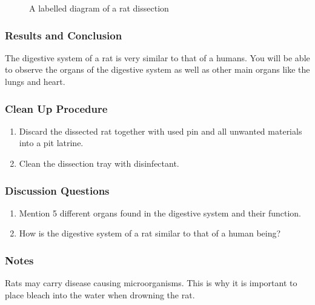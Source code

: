 \begin{figure}[h]
\begin{center}
\def\svgwidth{10cm}

\caption{A labelled diagram of a rat dissection}
\label{fig:rat-dissection}
\end{center}
\end{figure}

\subsubsection*{Results and Conclusion}
The digestive system of a rat is very similar to that of a humans. You will be able to observe the organs of the digestive system as well as other main organs like the lungs and heart.

\subsubsection*{Clean Up Procedure}
\begin{enumerate}
\item{Discard the dissected rat together with used pin and all unwanted materials into a pit latrine.}
\item{Clean the dissection tray with disinfectant.}
\end{enumerate}

\subsubsection*{Discussion Questions}
\begin{enumerate}
\item{Mention 5 different organs found in the digestive system and their function.}
\item{How is the digestive system of a rat similar to that of a human being?}
\end{enumerate}

\subsubsection*{Notes}
Rats may carry disease causing microorganisms. This is why it is important to place bleach into the water when drowning the rat.
